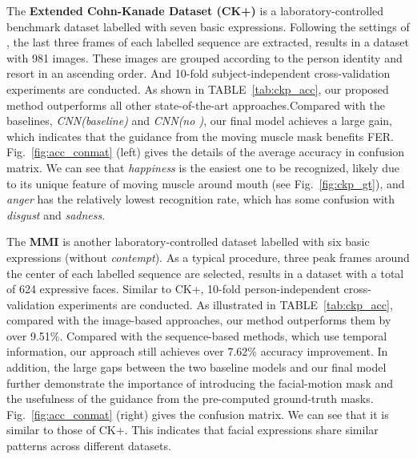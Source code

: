\documentclass[conference,a4paper]{IEEEtran}
\begin{document}
The \textbf{Extended Cohn-Kanade Dataset (CK+)} \cite{lucey2010extended} is a laboratory-controlled benchmark dataset labelled with seven basic expressions. Following the settings of \cite{yang2018facial}, the last three frames of each labelled sequence are extracted, results in a dataset with 981 images. These images are grouped according to the person identity and resort in an ascending order. And 10-fold subject-independent cross-validation experiments are conducted.
As shown in TABLE~\ref{tab:ckp_acc}, our proposed method outperforms all other state-of-the-art approaches.Compared with the baselines, \textit{CNN(baseline)} and \textit{CNN(no )}, our final model achieves a large gain, which indicates that the guidance from the moving muscle mask benefits FER. Fig.~\ref{fig:acc_conmat} (left) gives the details of the average accuracy in confusion matrix. We can see that \textit{happiness} is the easiest one to be recognized, likely due to its unique feature of moving muscle around mouth (see Fig.~\ref{fig:ckp_gt}), and \textit{anger} has the relatively lowest recognition rate, which has some confusion with \textit{disgust} and \textit{sadness}.










The \textbf{MMI} \cite{pantic2005web} is another laboratory-controlled dataset labelled with six basic expressions (without \textit{contempt}). As a typical procedure, three peak frames around the center of each labelled sequence are selected, results in a dataset with a total of 624 expressive faces. Similar to CK+, 10-fold person-independent cross-validation experiments are conducted.
As illustrated in TABLE~\ref{tab:ckp_acc}, compared with the image-based approaches, our method outperforms them by over 9.51\%. Compared with the sequence-based methods, which use temporal information, our approach still achieves over 7.62\% accuracy improvement. In addition, the large gaps between the two baseline models and our final model further demonstrate the importance of introducing the facial-motion mask and the usefulness of the guidance from the pre-computed ground-truth masks. Fig.~\ref{fig:acc_conmat} (right) gives the confusion matrix. We can see that it is similar to those of CK+. This indicates that facial expressions share similar patterns across different datasets.
\end{document}
